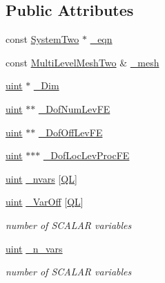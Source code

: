 \subsection*{Public Attributes}
\begin{DoxyCompactItemize}
\item 
const \mbox{\hyperlink{classfemus_1_1_system_two}{System\+Two}} $\ast$ \mbox{\hyperlink{classfemus_1_1_dof_map_ab5fc4366e3bf6ec70f918f7ff3a79d10}{\+\_\+eqn}}
\item 
const \mbox{\hyperlink{classfemus_1_1_multi_level_mesh_two}{Multi\+Level\+Mesh\+Two}} \& \mbox{\hyperlink{classfemus_1_1_dof_map_a659fb2627c739a4f4f0c95b1c53d0fe8}{\+\_\+mesh}}
\item 
\mbox{\hyperlink{_typedefs_8hpp_a91ad9478d81a7aaf2593e8d9c3d06a14}{uint}} $\ast$ \mbox{\hyperlink{classfemus_1_1_dof_map_a6a0a1e270ab5c9250e0385d6a0555cbb}{\+\_\+\+Dim}}
\item 
\mbox{\hyperlink{_typedefs_8hpp_a91ad9478d81a7aaf2593e8d9c3d06a14}{uint}} $\ast$$\ast$ \mbox{\hyperlink{classfemus_1_1_dof_map_a490a84023f8277b2c13e257f16a67433}{\+\_\+\+Dof\+Num\+Lev\+FE}}
\item 
\mbox{\hyperlink{_typedefs_8hpp_a91ad9478d81a7aaf2593e8d9c3d06a14}{uint}} $\ast$$\ast$ \mbox{\hyperlink{classfemus_1_1_dof_map_aca4b8f1a8579670d4c84a451009cbcd5}{\+\_\+\+Dof\+Off\+Lev\+FE}}
\item 
\mbox{\hyperlink{_typedefs_8hpp_a91ad9478d81a7aaf2593e8d9c3d06a14}{uint}} $\ast$$\ast$$\ast$ \mbox{\hyperlink{classfemus_1_1_dof_map_a058ca167654c137ccb33ce88ff4d983b}{\+\_\+\+Dof\+Loc\+Lev\+Proc\+FE}}
\item 
\mbox{\hyperlink{_typedefs_8hpp_a91ad9478d81a7aaf2593e8d9c3d06a14}{uint}} \mbox{\hyperlink{classfemus_1_1_dof_map_a537b67e0e240a5673e99135b6912a6dc}{\+\_\+nvars}} \mbox{[}\mbox{\hyperlink{_f_e_type_enum_8hpp_aca285339f9cf24489fdc0af5b51a5fde}{QL}}\mbox{]}
\item 
\mbox{\hyperlink{_typedefs_8hpp_a91ad9478d81a7aaf2593e8d9c3d06a14}{uint}} \mbox{\hyperlink{classfemus_1_1_dof_map_a45b5e2e1aca510da954ff2f96d95f42c}{\+\_\+\+Var\+Off}} \mbox{[}\mbox{\hyperlink{_f_e_type_enum_8hpp_aca285339f9cf24489fdc0af5b51a5fde}{QL}}\mbox{]}
\begin{DoxyCompactList}\small\item\em number of S\+C\+A\+L\+AR variables \end{DoxyCompactList}\item 
\mbox{\hyperlink{_typedefs_8hpp_a91ad9478d81a7aaf2593e8d9c3d06a14}{uint}} \mbox{\hyperlink{classfemus_1_1_dof_map_a1813c139353803d4e0132fd6761f73fc}{\+\_\+n\+\_\+vars}}
\begin{DoxyCompactList}\small\item\em number of S\+C\+A\+L\+AR variables \end{DoxyCompactList}\end{DoxyCompactItemize}



